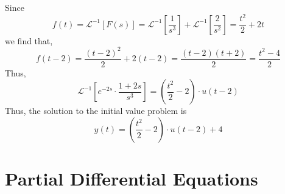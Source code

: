 \documentclass[a4paper]{article}
\begin{document}
\begin{enumerate}
\begin{equation*}
    \end{equation*}
    Since
    \begin{equation*}
        f(t)=\mathcal{L}^{-1}[F(s)]=\mathcal{L}^{-1}[\frac{1}{s^3}]+\mathcal{L}^{-1}[\frac{2}{s^2}]=\frac{t^2}{2}+2t
    \end{equation*}
    we find that,
    \begin{equation*}
        f(t-2)=\frac{(t-2)^2}{2}+2(t-2)=\frac{(t-2)(t+2)}{2}=\frac{t^2-4}{2}
    \end{equation*}
    Thus,
    \begin{equation*}
        \mathcal{L}^{-1}[e^{-2s}\cdot \frac{1+2s}{s^3}]=(\frac{t^2}{2}-2)\cdot u(t-2)
    \end{equation*}
    Thus, the solution to the initial value problem is
    \begin{equation*}
        y(t)=(\frac{t^2}{2}-2)\cdot u(t-2)+4
    \end{equation*}
\end{enumerate}
\newpage
\section{Partial Differential Equations}
\end{document}

